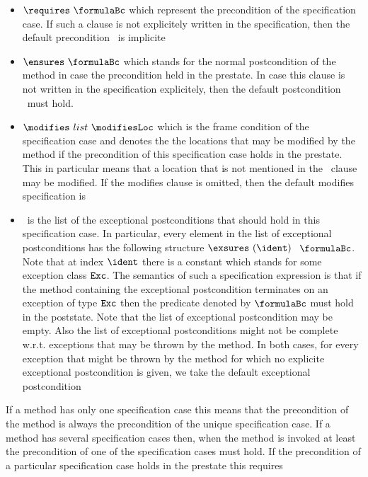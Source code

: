 \begin{itemize}
      \item $\requires \ \formulaBc$ which represent the   precondition of the specification case. If such a clause is not explicitely written
            in the specification, then the default precondition  \Mytrue \ is implicite
      \item $\ensures \ \formulaBc$   which stands for the normal postcondition of the method in case the precondition held in the prestate.
            In case this clause is not written in the specification explicitely, then the default postcondition   \Mytrue \  must hold.
      \item $\modifies \ list \ \modifiesLoc $   which is the frame condition of the specification case and denotes the 
            the locations that may be modified by the method if the precondition of this specification case holds in the prestate.
	    This in particular means that a location that is not mentioned in the \modifies \  clause may be modified. 
	    If the modifies clause is omitted, then the default modifies specification is \modifies \ \everything
      \item \exsuresList \  is the list of the exceptional postconditions that should hold in this specification case. In particular,
            every element in the list of exceptional postconditions has the following structure 
	    $ \exsures \ ( \ident )  $ $\ \formulaBc$. 
	    Note that  at index $\ident$  there is a constant which stands for some exception class  $\mbox{\rm\texttt{Exc}}$.
	    The semantics of such a specification expression is that if the method 
	    containing the exceptional postcondition terminates on an exception of type   $\mbox{\rm\texttt{Exc}}$
	    then the predicate denoted by $\formulaBc$ must hold in the poststate. Note that the list of exceptional postcondition may be empty.
	    Also the list of exceptional postconditions might not be complete w.r.t. exceptions that may be thrown  by the method.
	    In both cases, for every
	    exception that might be thrown by the method for which no explicite exceptional postcondition is given,
	     we take the default exceptional postcondition
	    \Myfalse
\end{itemize}
If a method has only one specification case this means that the precondition of the method is always the precondition of the unique 
specification case. If a method has several specification cases then, when the method is invoked at least the precondition of one 
of the specification cases must hold. If the precondition of a particular specification case holds in the prestate this requires
